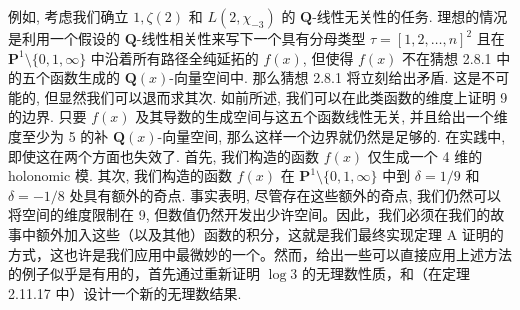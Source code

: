 例如, 考虑我们确立 \(1, \zeta(2)\) 和 \(L(2,\chi_{-3})\) 的 \(\mathbf{Q}\)-线性无关性的任务. 理想的情况是利用一个假设的 \(\mathbf{Q}\)-线性相关性来写下一个具有分母类型 \(\tau = [1,2,\dots,n]^2\) 且在 \(\mathbf{P}^1 \setminus \{0,1,\infty\}\) 中沿着所有路径全纯延拓的 \(f(x)\), 但使得 \(f(x)\) 不在猜想 2.8.1 中的五个函数生成的 \(\mathbf{Q}(x)\)-向量空间中. 那么猜想 2.8.1 将立刻给出矛盾. 这是不可能的, 但显然我们可以退而求其次. 如前所述, 我们可以在此类函数的维度上证明 9 的边界. 只要 \(f(x)\) 及其导数的生成空间与这五个函数线性无关, 并且给出一个维度至少为 5 的补 \(\mathbf{Q}(x)\)-向量空间, 那么这样一个边界就仍然是足够的. 在实践中, 即使这在两个方面也失效了. 首先, 我们构造的函数 \(f(x)\) 仅生成一个 4 维的 holonomic 模. 其次, 我们构造的函数 \(f(x)\) 在 \(\mathbf{P}^1 \setminus \{0,1,\infty\}\) 中到 \(\delta = 1/9\) 和 \(\delta = -1/8\) 处具有额外的奇点. 事实表明, 尽管存在这些额外的奇点, 我们仍然可以将空间的维度限制在 9, 但数值仍然开发出少许空间。因此，我们必须在我们的故事中额外加入这些（以及其他）函数的积分，这就是我们最终实现定理 A 证明的方式，这也许是我们应用中最微妙的一个。然而，给出一些可以直接应用上述方法的例子似乎是有用的，首先通过重新证明 $\log 3$ 的无理数性质，和（在定理 2.11.17 中）设计一个新的无理数结果.

